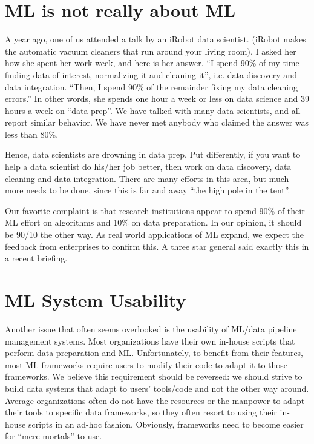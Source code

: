\documentclass[11pt]{article}
\begin{document}
\section{ML is not really about ML}
A year ago, one of us attended a talk by an iRobot data scientist.  (iRobot makes the automatic vacuum cleaners that run around your living room).  I asked her how she spent her work week, and here is her answer. ``I spend 90\% of my time finding data of interest, normalizing it and cleaning it'', i.e. data discovery and data integration.  ``Then, I spend 90\% of the remainder fixing my data cleaning errors.''  In other words, she spends one hour a week or less on data science and 39 hours a week on ``data prep''.    We have talked with many data scientists, and all report similar behavior.  We have never met anybody who claimed the answer was less than 80\%.  

Hence, data scientists are drowning in data prep.  Put differently, if you want to help a data scientist do his/her job better, then work on data discovery, data cleaning and data integration.  There are many efforts in this area, but much more needs to be done, since this is far and away “the high pole in the tent”.  

Our favorite complaint is that research institutions appear to spend 90\% of their ML effort on algorithms and 10\% on data preparation.  In our opinion, it should be 90/10 the other way.  As real world applications of ML expand, we expect the feedback from enterprises to confirm this.  A three star general said exactly this in a recent briefing.

\section{ML System Usability}
Another issue that often seems overlooked is the usability of ML/data pipeline management systems. Most organizations have their own in-house scripts that perform data preparation and ML. Unfortunately, to benefit from their features, most ML frameworks require users to modify their code to adapt it to those frameworks. We believe this requirement should be reversed: we should strive to build data systems that adapt to users’ tools/code and not the other way around. Average organizations often do not have the resources or the manpower to adapt their tools to specific data frameworks, so they often resort to using their in-house scripts in an ad-hoc fashion.  Obviously, frameworks need to become easier for “mere mortals” to use.
\end{document}
